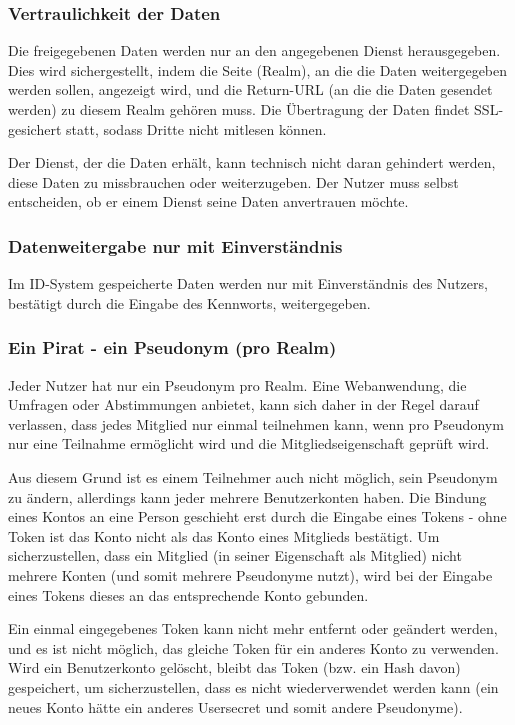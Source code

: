 \documentclass[parskip=half]{scrartcl}
\begin{document}
\subsubsection{Vertraulichkeit der Daten}
Die freigegebenen Daten werden nur an den angegebenen Dienst herausgegeben.
Dies wird sichergestellt, indem die Seite (Realm), an die die Daten weitergegeben werden sollen, angezeigt wird,
und die Return-URL (an die die Daten gesendet werden) zu diesem Realm gehören muss.
Die Übertragung der Daten findet SSL-gesichert statt, sodass Dritte nicht mitlesen können.

Der Dienst, der die Daten erhält, kann technisch nicht daran gehindert werden, diese Daten zu missbrauchen oder weiterzugeben.
Der Nutzer muss selbst entscheiden, ob er einem Dienst seine Daten anvertrauen möchte.

\subsubsection{Datenweitergabe nur mit Einverständnis}
Im ID-System gespeicherte Daten werden nur mit Einverständnis des Nutzers, bestätigt durch die Eingabe des Kennworts, weitergegeben.

\subsubsection{Ein Pirat - ein Pseudonym (pro Realm)}
Jeder Nutzer hat nur ein Pseudonym pro Realm.
Eine Webanwendung, die Umfragen oder Abstimmungen anbietet, kann sich daher in der Regel darauf verlassen, dass jedes Mitglied nur einmal teilnehmen kann,
wenn pro Pseudonym nur eine Teilnahme ermöglicht wird und die Mitgliedseigenschaft geprüft wird.

Aus diesem Grund ist es einem Teilnehmer auch nicht möglich, sein Pseudonym zu ändern, allerdings kann jeder mehrere Benutzerkonten haben.
Die Bindung eines Kontos an eine Person geschieht erst durch die Eingabe eines Tokens - ohne Token ist das Konto nicht als das Konto eines Mitglieds bestätigt.
Um sicherzustellen, dass ein Mitglied (in seiner Eigenschaft als Mitglied) nicht mehrere Konten (und somit mehrere Pseudonyme nutzt),
wird bei der Eingabe eines Tokens dieses an das entsprechende Konto gebunden.

Ein einmal eingegebenes Token kann nicht mehr entfernt oder geändert werden, und es ist nicht möglich, das gleiche Token für ein anderes Konto zu verwenden.
Wird ein Benutzerkonto gelöscht, bleibt das Token (bzw. ein Hash davon) gespeichert, um sicherzustellen, dass es nicht wiederverwendet werden kann
(ein neues Konto hätte ein anderes Usersecret und somit andere Pseudonyme).
\end{document}
